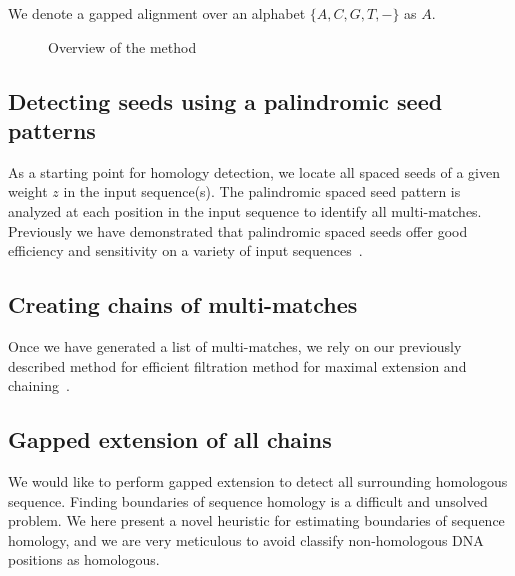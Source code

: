 \documentclass{llncs}
\begin{document}
We denote a gapped alignment over an alphabet $\{A,C,G,T,-\}$ as $A$. 

\begin{figure}[t]
\begin{center}
\end{center}
\caption{Overview of the method}
\end{figure}



\subsection{Detecting seeds using a palindromic seed patterns}

As a starting point for homology detection, we locate all spaced seeds of a given weight $z$ in the input sequence(s). The palindromic spaced seed pattern is analyzed at each position in the input sequence to identify all multi-matches.  Previously we have demonstrated that palindromic spaced seeds offer good efficiency and sensitivity on a variety of input sequences~\cite{ref-procrast}. 

\subsection{Creating chains of multi-matches}

Once we have generated a list of multi-matches, we rely on our previously described method for efficient filtration method for maximal extension and chaining~\cite{ref-procrast}. 


\subsection{Gapped extension of all chains}
We would like to perform gapped
extension to detect all surrounding homologous sequence. Finding boundaries of sequence homology is a difficult and unsolved problem. We here present a novel heuristic for estimating boundaries of sequence homology, and we are very meticulous to avoid classify non-homologous DNA positions as homologous.
\end{document}
